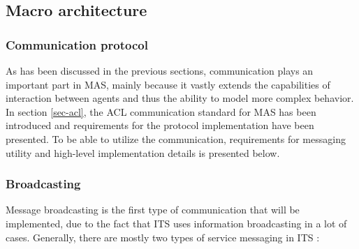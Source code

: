 \documentclass[0main.tex]{subfiles}
\begin{document}

\pagebreak



\subsection{Macro architecture}

\subsubsection{Communication protocol}

As has been discussed in the previous sections, communication plays an important part in 
MAS, mainly because it vastly extends the capabilities of interaction between agents and thus 
the ability to model more complex behavior. In section \ref{sec-acl}, the ACL communication 
standard for MAS has been introduced and requirements for the protocol implementation have 
been presented. To be able to utilize the communication, requirements for messaging utility and
high-level implementation details is presented below. 

\subsubsection{Broadcasting}

Message broadcasting is the first type of communication that will be implemented, due to the
fact that ITS uses information broadcasting in a lot of cases. Generally, there are mostly two
types of service messaging in ITS \cite{Santa2013}:
\end{document}
